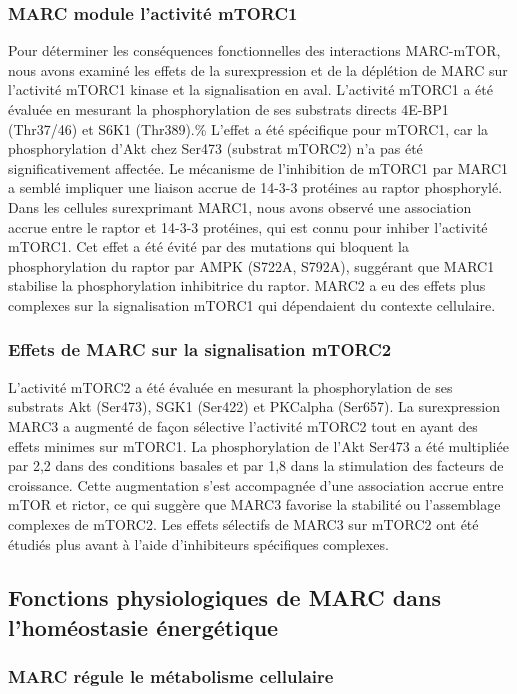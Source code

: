 \documentclass[11pt,a4paper]{article}
\begin{document}
\subsubsection{MARC module l'activité mTORC1}

Pour déterminer les conséquences fonctionnelles des interactions MARC-mTOR, nous avons examiné les effets de la surexpression et de la déplétion de MARC sur l'activité mTORC1 kinase et la signalisation en aval. L'activité mTORC1 a été évaluée en mesurant la phosphorylation de ses substrats directs 4E-BP1 (Thr37/46) et S6K1 (Thr389).\% L'effet a été spécifique pour mTORC1, car la phosphorylation d'Akt chez Ser473 (substrat mTORC2) n'a pas été significativement affectée. Le mécanisme de l'inhibition de mTORC1 par MARC1 a semblé impliquer une liaison accrue de 14-3-3 protéines au raptor phosphorylé. Dans les cellules surexprimant MARC1, nous avons observé une association accrue entre le raptor et 14-3-3 protéines, qui est connu pour inhiber l'activité mTORC1. Cet effet a été évité par des mutations qui bloquent la phosphorylation du raptor par AMPK (S722A, S792A), suggérant que MARC1 stabilise la phosphorylation inhibitrice du raptor. MARC2 a eu des effets plus complexes sur la signalisation mTORC1 qui dépendaient du contexte cellulaire.

\subsubsection{Effets de MARC sur la signalisation mTORC2}

L'activité mTORC2 a été évaluée en mesurant la phosphorylation de ses substrats Akt (Ser473), SGK1 (Ser422) et PKCalpha (Ser657). La surexpression MARC3 a augmenté de façon sélective l'activité mTORC2 tout en ayant des effets minimes sur mTORC1. La phosphorylation de l'Akt Ser473 a été multipliée par 2,2 dans des conditions basales et par 1,8 dans la stimulation des facteurs de croissance. Cette augmentation s'est accompagnée d'une association accrue entre mTOR et rictor, ce qui suggère que MARC3 favorise la stabilité ou l'assemblage complexes de mTORC2. Les effets sélectifs de MARC3 sur mTORC2 ont été étudiés plus avant à l'aide d'inhibiteurs spécifiques complexes.

\subsection{Fonctions physiologiques de MARC dans l'homéostasie énergétique}

\subsubsection{MARC régule le métabolisme cellulaire}
\end{document}
